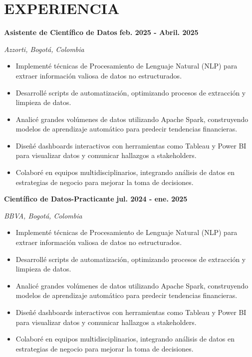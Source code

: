 \documentclass[paper=a4,fontsize=11pt]{scrartcl} %
\newcommand{\sepspace}{\vspace*{0.8em}}
\newcommand{\NewPart}[1]{\section*{\uppercase{#1}}}
\newcommand{\WorkEntry}[4]{%
  \noindent \textbf{#1} \hfill \textbf{#2} \par
  \noindent \textit{#3} \par
  \noindent \small #4 
  \normalsize \par \sepspace
}
\begin{document}
\NewPart{Experiencia}
\WorkEntry{Asistente de Científico de Datos}{feb. 2025 - Abril. 2025}{Azzorti, Bogotá, Colombia}{%
\begin{itemize}[leftmargin=*, noitemsep]
    \item Implementé técnicas de Procesamiento de Lenguaje Natural (NLP) para extraer información valiosa de datos no estructurados.
    \item Desarrollé scripts de automatización, optimizando procesos de extracción y limpieza de datos.
    \item Analicé grandes volúmenes de datos utilizando Apache Spark, construyendo modelos de aprendizaje automático para predecir tendencias financieras.
    \item Diseñé dashboards interactivos con herramientas como Tableau y Power BI para visualizar datos y comunicar hallazgos a stakeholders.
    \item Colaboré en equipos multidisciplinarios, integrando análisis de datos en estrategias de negocio para mejorar la toma de decisiones.
\end{itemize}
}

\WorkEntry{Científico de Datos-Practicante}{jul. 2024 - ene. 2025}{BBVA, Bogotá, Colombia}{%
\begin{itemize}[leftmargin=*, noitemsep]
    \item Implementé técnicas de Procesamiento de Lenguaje Natural (NLP) para extraer información valiosa de datos no estructurados.
    \item Desarrollé scripts de automatización, optimizando procesos de extracción y limpieza de datos.
    \item Analicé grandes volúmenes de datos utilizando Apache Spark, construyendo modelos de aprendizaje automático para predecir tendencias financieras.
    \item Diseñé dashboards interactivos con herramientas como Tableau y Power BI para visualizar datos y comunicar hallazgos a stakeholders.
    \item Colaboré en equipos multidisciplinarios, integrando análisis de datos en estrategias de negocio para mejorar la toma de decisiones.
\end{itemize}
}
\end{document}
